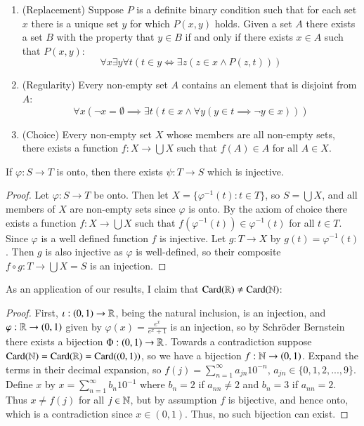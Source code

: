 \begin{axiom}
\begin{enumerate}
        \item (Replacement) Suppose $P$ is a definite binary condition such that for each set $x$ there is a unique set $y$ for which $P(x,y)$ holds. Given a set $A$ there exists a set $B$ with the property that $y \in B$ if and only if there exists $x \in A$ such that $P(x,y)$: $$\forall x\exists y\forall t(t \in y \iff \exists z(z \in x \land P(z,t)))$$
        \item (Regularity) Every non-empty set $A$ contains an element that is disjoint from $A$: $$\forall x(\lnot x = \emptyset \implies \exists t(t \in x \land \forall y(y \in t\implies \lnot y \in x)))$$
        \item (Choice) Every non-empty set $X$ whose members are all non-empty sets, there exists a function $f:X\rightarrow \bigcup X$ such that $f(A) \in A$ for all $A \in X$.
    \end{enumerate}
\end{axiom}

\begin{lemma}
    If $\varphi:S\rightarrow T$ is onto, then there exists $\psi:T\rightarrow S$ which is injective.
\end{lemma}
\begin{proof}
    Let $\varphi:S\rightarrow T$ be onto. Then let $X = \{\varphi^{-1}(t):t \in T\}$, so $S = \bigcup X$, and all members of $X$ are non-empty sets since $\varphi$ is onto. By the axiom of choice there exists a function $f:X\rightarrow \bigcup X$ such that $f(\varphi^{-1}(t)) \in \varphi^{-1}(t)$ for all $t \in T$. Since $\varphi$ is a well defined function $f$ is injective. Let $g:T\rightarrow X$ by $g(t) = \varphi^{-1}(t)$. Then $g$ is also injective as $\varphi$ is well-defined, so their composite $f\circ g:T\rightarrow \bigcup X = S$ is an injection.
\end{proof} 

As an application of our results, I claim that $\text{Card}(\mathbb R)\neq \text{Card}(\mathbb N)$:

\begin{proof}
    First, $\iota:(0,1)\rightarrow \mathbb R$, being the natural inclusion, is an injection, and $\varphi:\mathbb R\rightarrow (0,1)$ given by $\varphi(x) = \frac{e^x}{e^x+1}$ is an injection, so by Schr\"{o}der Bernstein there exists a bijection $\Phi:(0,1)\rightarrow \mathbb R$. Towards a contradiction suppose $\text{Card}(\mathbb N) = \text{Card}(\mathbb R) = \text{Card}((0,1))$, so we have a bijection $f:\mathbb N\rightarrow (0,1)$. Expand the terms in their decimal expansion, so $f(j) = \sum_{n=1}^{\infty}a_{jn}10^{-n}$, $a_{jn} \in \{0,1,2,...,9\}$. Define $x$ by $x = \sum_{n=1}^{\infty}b_n10^{-1}$ where $b_n = 2$ if $a_{nn} \neq 2$ and $b_n = 3$ if $a_{nn} = 2$. Thus $x \neq f(j)$ for all $j \in \mathbb N$, but by assumption $f$ is bijective, and hence onto, which is a contradiction since $x \in (0,1)$. Thus, no such bijection can exist.
\end{proof}

